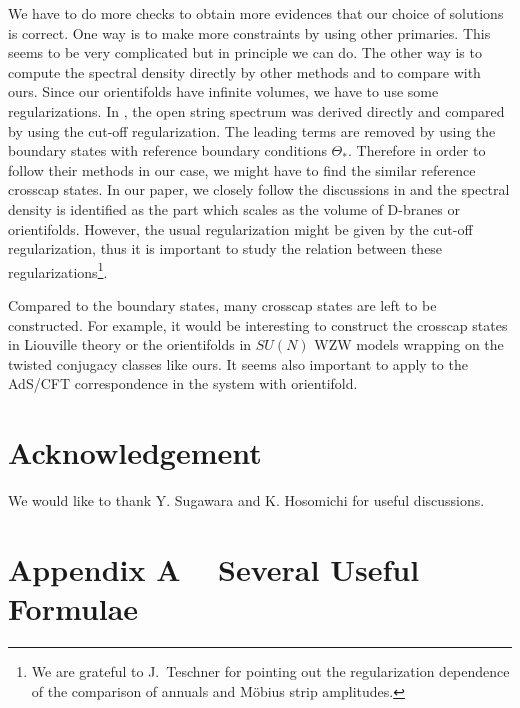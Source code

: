 \documentclass[a4paper,12pt]{article}
\def\theequation{\thesection.\arabic{equation}}
\begin{document}
We have to do more checks to obtain more evidences that our choice of
solutions is correct. One way is to make more constraints by using
other primaries. This seems to be very complicated but in principle we
can do. 
The other way is to compute the spectral density directly 
by other methods and to compare with ours. 
Since our orientifolds have infinite
volumes, we have to use some regularizations. In \cite{PST}, the open
string spectrum was derived directly and compared by using the cut-off
regularization. The leading terms are removed by using the
boundary states with reference boundary conditions $\Theta_{*}$.
Therefore in order to follow their methods in our case,
we might have to find the similar reference crosscap states.
In our paper, we closely follow the discussions in \cite{LOP} and
the spectral density is identified as the part which scales as the volume of
D-branes or orientifolds. However, the usual regularization might be
given by the cut-off regularization, thus it is important to study the
relation between these regularizations\footnote{
We are grateful to J.~Teschner for pointing out the regularization
dependence of the comparison of annuals and M\"{o}bius strip amplitudes.}.

Compared to the boundary states, many crosscap states are left to be  
constructed. For example, it would be interesting to construct the
crosscap states in Liouville theory or the orientifolds in $SU(N)$ WZW
models wrapping on the twisted conjugacy classes like ours.
It seems also important to apply to the AdS/CFT correspondence in
the system with orientifold. 


\section*{Acknowledgement}
\indent

We would like to thank Y. Sugawara and K. Hosomichi for useful
discussions.


\section*{Appendix A ~ Several Useful Formulae}
\setcounter{equation}{0}
\def\theequation{A.\arabic{equation}}
\indent
\end{document}
